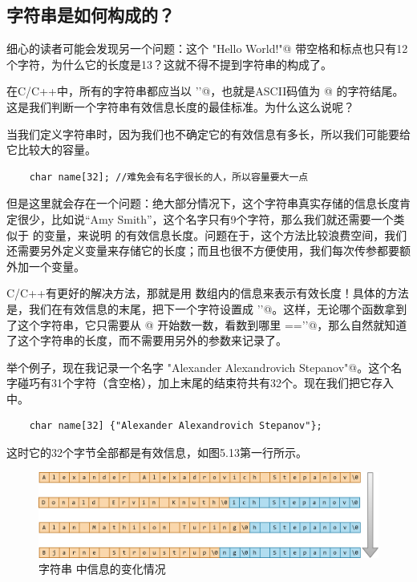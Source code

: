 \subsection*{字符串是如何构成的？}
细心的读者可能会发现另一个问题：这个 \lstinline@"Hello World!"@ 带空格和标点也只有12个字符，为什么它的长度是13？这就不得不提到字符串的构成了。\par
在C/C++中，所有的字符串都应当以 \lstinline@'\0'@，也就是ASCII码值为 @ 的字符结尾。这是我们判断一个字符串有效信息长度的最佳标准。为什么这么说呢？\par
当我们定义字符串时，因为我们也不确定它的有效信息有多长，所以我们可能要给它比较大的容量。
\begin{lstlisting}
    char name[32]; //难免会有名字很长的人，所以容量要大一点
\end{lstlisting}
但是这里就会存在一个问题：绝大部分情况下，这个字符串真实存储的信息长度肯定很少，比如说``Amy Smith''，这个名字只有9个字符，那么我们就还需要一个类似于 \lstinline@size@ 的变量，来说明 \lstinline@name@ 的有效信息长度。问题在于，这个方法比较浪费空间，我们还需要另外定义变量来存储它的长度；而且也很不方便使用，我们每次传参都要额外加一个变量。\par
C/C++有更好的解决方法，那就是用 \lstinline@name@ 数组内的信息来表示有效长度！具体的方法是，我们在有效信息的末尾，把下一个字符设置成 \lstinline@'\0'@。这样，无论哪个函数拿到了这个字符串，它只需要从 \lstinline@name[0]@ 开始数一数，看数到哪里 \lstinline@name[i]=='\0'@，那么自然就知道了这个字符串的长度，而不需要用另外的参数来记录了。\par
举个例子，现在我记录一个名字 \lstinline@"Alexander Alexandrovich Stepanov"@。这个名字碰巧有31个字符（含空格），加上末尾的结束符共有32个。现在我们把它存入 \lstinline@name@ 中。
\begin{lstlisting}
    char name[32] {"Alexander Alexandrovich Stepanov"};
\end{lstlisting}
这时它的32个字节全部都是有效信息，如图5.13第一行所示。\par
\begin{figure}[htbp]
    \centering
    \includegraphics[width=\textwidth]{../images/generalized_parts/05_Information_in_the_string_300.png}
    \caption{字符串 \lstinline@name@ 中信息的变化情况}
\end{figure}

